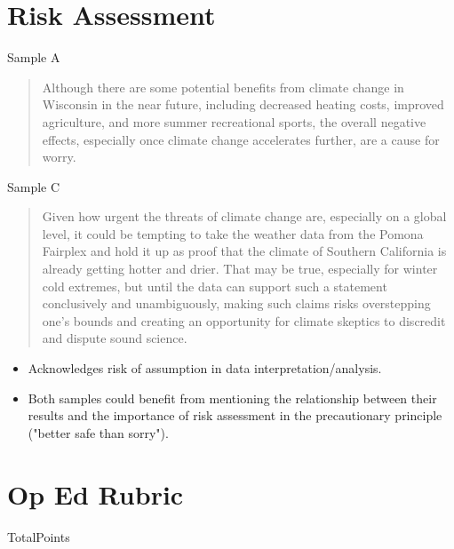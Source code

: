\documentclass{article}\usepackage[]{graphicx}\usepackage[]{color}
\begin{document}
\section{Risk Assessment}
Sample A
\begin{quote}
Although there are some potential benefits from climate change in Wisconsin in the near future, including decreased heating costs, improved agriculture, and more summer recreational sports, the overall negative effects, especially once climate change accelerates further, are a cause for worry.
\end{quote}

Sample C
\begin{quote}
Given how urgent the threats of climate change are, especially on a global level, it could be tempting to take the weather data from the Pomona Fairplex and hold it up as proof that the climate of Southern California is already getting hotter and drier. That may be true, especially for winter cold extremes, but until the data can support such a statement conclusively and unambiguously, making such claims risks overstepping one’s bounds and creating an opportunity for climate skeptics to discredit and dispute sound science.
\end{quote}
\begin{itemize}
\item Acknowledges risk of assumption in data interpretation/analysis. 
  \item Both samples could benefit from mentioning the relationship between their results and the importance of risk assessment in the precautionary principle ("better safe than sorry"). 
\end{itemize}

\newpage

\section{Op Ed Rubric}

TotalPoints
\end{document}
